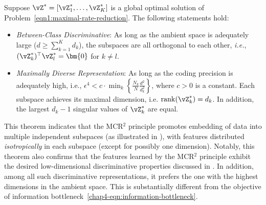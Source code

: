 \documentclass[../../book-main.tex]{subfiles}
\begin{document}
\begin{theorem}
    Suppose $\vZ^{\ast} = [\vZ_1^*,\dots,\vZ_K^*]$ is a global optimal
    solution of Problem~\eqref{eqn1:maximal-rate-reduction}. The
    following statements hold:
    \begin{itemize}
        \item {\em Between-Class Discriminative}: As long as the ambient
            space is adequately large ($d \ge \sum_{k=1}^{K} d_k$), the
            subspaces are all orthogonal to each other, {\em i.e.},
            $(\vZ_{k}^*)^{\top} \vZ_{l}^* = \bm{0}$ for $k \not= l$.
        \item {\em Maximally Diverse Representation}:
            As long as the coding precision is adequately high, i.e.,
            $\epsilon ^4 < c\cdot \min_{k}\left\{
            \frac{N_k}{N}\frac{d^2}{d_k^2}\right\}$, where $c>0$ is a
            constant. Each subspace achieves its maximal dimension, i.e.
            $\mathrm{rank}{(\vZ_{k}^*)}= d_k$. In addition, the largest
            $d_k-1$ singular values of $\vZ_{k}^*$ are equal.
            \label{thm:MCR2-properties}
    \end{itemize}
\end{theorem}

This theorem indicates that the MCR$^2$ principle promotes embedding
of data into multiple independent subspaces (as illustrated in
), with features distributed {\em isotropically}
in each subspace (except for possibly one dimension). Notably, this
theorem also confirms that the features learned by the MCR$^2$
principle exhibit the desired low-dimensional discriminative
properties discussed in . In addition, among all
such discriminative representations, it prefers the one with the
highest dimensions in the ambient space. This is substantially
different from the objective of information
bottleneck~\eqref{chap4-eqn:information-bottleneck}.
\end{document}
